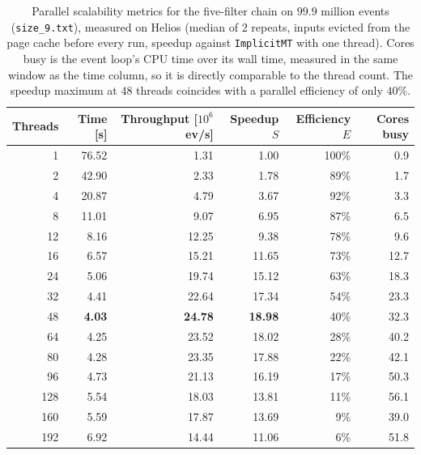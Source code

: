 \begin{table}[htbp]
\centering
\caption{Parallel scalability metrics for the five-filter chain on $99.9$ million events (\texttt{size\_9.txt}), measured on Helios (median of 2 repeats, inputs evicted from the page cache before every run, speedup against \texttt{ImplicitMT} with one thread). Cores busy is the event loop's CPU time over its wall time, measured in the same window as the time column, so it is directly comparable to the thread count. The speedup maximum at 48 threads coincides with a parallel efficiency of only $40\%$.}
\label{tab:scalability-chain}
\begin{tabular}{rrrrrr}
\toprule
Threads & Time [s] & Throughput [$10^6$ ev/s] & Speedup $S$ & Efficiency $E$ & Cores busy \\
\midrule
 1 & 76.52 & 1.31 & 1.00 & 100\% & 0.9 \\
 2 & 42.90 & 2.33 & 1.78 & 89\% & 1.7 \\
 4 & 20.87 & 4.79 & 3.67 & 92\% & 3.3 \\
 8 & 11.01 & 9.07 & 6.95 & 87\% & 6.5 \\
12 & 8.16 & 12.25 & 9.38 & 78\% & 9.6 \\
16 & 6.57 & 15.21 & 11.65 & 73\% & 12.7 \\
24 & 5.06 & 19.74 & 15.12 & 63\% & 18.3 \\
32 & 4.41 & 22.64 & 17.34 & 54\% & 23.3 \\
48 & \textbf{4.03} & \textbf{24.78} & \textbf{18.98} & 40\% & 32.3 \\
64 & 4.25 & 23.52 & 18.02 & 28\% & 40.2 \\
80 & 4.28 & 23.35 & 17.88 & 22\% & 42.1 \\
96 & 4.73 & 21.13 & 16.19 & 17\% & 50.3 \\
128 & 5.54 & 18.03 & 13.81 & 11\% & 56.1 \\
160 & 5.59 & 17.87 & 13.69 & 9\% & 39.0 \\
192 & 6.92 & 14.44 & 11.06 & 6\% & 51.8 \\
\bottomrule
\end{tabular}
\end{table}
